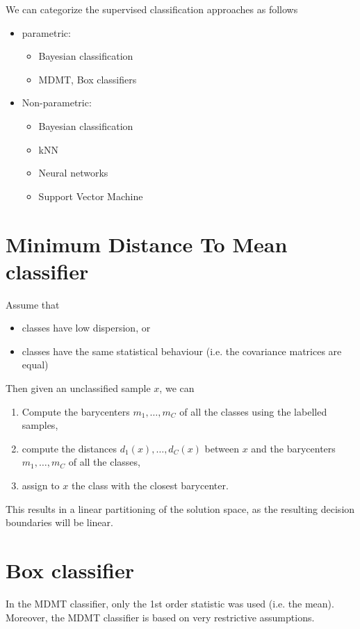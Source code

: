 \documentclass[oneside,onecolumn]{report}
\begin{document}
We can categorize the supervised classification approaches as follows
\begin{itemize}
    \item parametric:
    \begin{itemize}
        \item Bayesian classification
        \item MDMT, Box classifiers
    \end{itemize}

    \item Non-parametric:
    \begin{itemize}
        \item Bayesian classification
        \item kNN
        \item Neural networks
        \item Support Vector Machine
    \end{itemize}
\end{itemize}

\section{Minimum Distance To Mean classifier}
Assume that
\begin{itemize}
    \item classes have low dispersion, or
    \item classes have the same statistical behaviour (i.e. the covariance matrices are equal)
\end{itemize}

Then given an unclassified sample $x$, we can
\begin{enumerate}
    \item Compute the barycenters $m_1, \dots, m_C$ of all the classes using the labelled samples,
    \item compute the distances $d_1(x), \dots, d_C(x)$ between $x$ and the barycenters $m_1, \dots, m_C$ of all the classes,
    \item assign to $x$ the class with the closest barycenter.
\end{enumerate}

This results in a linear partitioning of the solution space, as the resulting decision boundaries will be linear.

\section{Box classifier}
In the MDMT classifier, only the 1st order statistic was used (i.e. the mean).
Moreover, the MDMT classifier is based on very restrictive assumptions.
\end{document}

